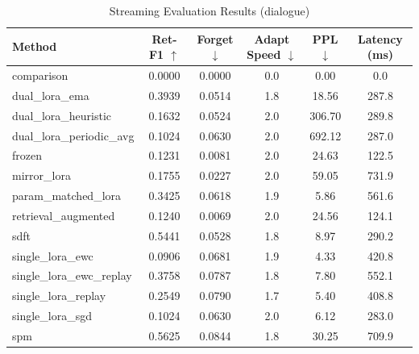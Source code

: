 \begin{table}[h]
\centering
\caption{Streaming Evaluation Results (dialogue)}
\begin{tabular}{lccccc}
\toprule
Method & Ret-F1 $\uparrow$ & Forget $\downarrow$ & Adapt Speed $\downarrow$ & PPL $\downarrow$ & Latency (ms) \\
\midrule
comparison & 0.0000 & 0.0000 & 0.0 & 0.00 & 0.0 \\
dual_lora_ema & 0.3939 & 0.0514 & 1.8 & 18.56 & 287.8 \\
dual_lora_heuristic & 0.1632 & 0.0524 & 2.0 & 306.70 & 289.8 \\
dual_lora_periodic_avg & 0.1024 & 0.0630 & 2.0 & 692.12 & 287.0 \\
frozen & 0.1231 & 0.0081 & 2.0 & 24.63 & 122.5 \\
mirror_lora & 0.1755 & 0.0227 & 2.0 & 59.05 & 731.9 \\
param_matched_lora & 0.3425 & 0.0618 & 1.9 & 5.86 & 561.6 \\
retrieval_augmented & 0.1240 & 0.0069 & 2.0 & 24.56 & 124.1 \\
sdft & 0.5441 & 0.0528 & 1.8 & 8.97 & 290.2 \\
single_lora_ewc & 0.0906 & 0.0681 & 1.9 & 4.33 & 420.8 \\
single_lora_ewc_replay & 0.3758 & 0.0787 & 1.8 & 7.80 & 552.1 \\
single_lora_replay & 0.2549 & 0.0790 & 1.7 & 5.40 & 408.8 \\
single_lora_sgd & 0.1024 & 0.0630 & 2.0 & 6.12 & 283.0 \\
spm & 0.5625 & 0.0844 & 1.8 & 30.25 & 709.9 \\
\bottomrule
\end{tabular}
\end{table}